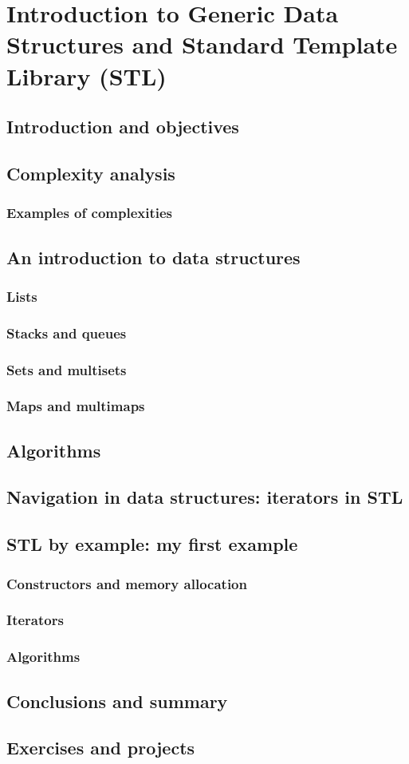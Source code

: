 \chapter{Introduction to Generic Data Structures and Standard Template Library (STL)}

\section{Introduction and objectives}
\section{Complexity analysis}

\subsection{Examples of complexities}

\section{An introduction to data structures}

\subsection{Lists}
\subsection{Stacks and queues}
\subsection{Sets and multisets}
\subsection{Maps and multimaps}

\section{Algorithms}
\section{Navigation in data structures: iterators in STL}
\section{STL by example: my first example}

\subsection{Constructors and memory allocation}
\subsection{Iterators}
\subsection{Algorithms}

\section{Conclusions and summary}
\section{Exercises and projects}